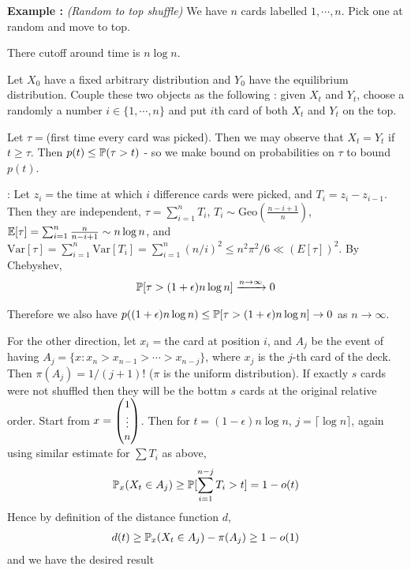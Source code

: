\documentclass[12pt,a4paper]{article}
\newenvironment{proof}
{\begin{changemargin}{1cm}{0.5cm} 
	}%
	{\end{changemargin}
}
\newenvironment{subproof}
{\begin{changemargin}{0.5cm}{0.5cm} 
	}%
	{\end{changemargin}
}
\newenvironment{p}
{\begin{proof} 
	}%
	{\end{proof}
}
\begin{document}
\textbf{Example :} \emph{(Random to top shuffle)} We have $n$ cards labelled $1, \cdots, n$. Pick one at random and move to top.
\s

 There cutoff around time is $n\log n$.
\begin{p}
\pf Let $X_0$ have a fixed arbitrary distribution and $Y_0$ have the equilibrium distribution. Couple these two objects as the following : given $X_t$ and $Y_t$, choose a randomly a number $i \in \{1,\cdots, n\}$ and put $i$th card of both $X_t$ and $Y_t$ on the top.

\quad Let $\tau =$(first time every card was picked). Then we may observe that $X_t = Y_t$ if $t \geq \tau$. Then $p(t) \leq \mathbb{P} (\tau >t )$ - so we make bound on probabilities on $\tau$ to bound $p(t)$.
\begin{subproof}
: Let $z_i=$the time at which $i$ difference cards were picked, and $T_i = z_i - z_{i-1}$. Then they are independent, $\tau = \sum_{i=1}^n T_i$, $T_i \sim \text{Geo}(\frac{n-i+1}{n})$, $\mathbb{E}[\tau] = \sum_{i=1}^n \frac{n}{n-i+1} \sim n\log n$, and $\text{Var}[\tau] = \sum_{i=1}^n \text{Var}[T_i] = \sum_{i=1}^n (n/i)^2 \leq n^2 \pi^2/6 \ll (E[\tau])^2$. By Chebyshev,
\begin{align*}
\mathbb{P}[\tau > (1+\epsilon) n\log n] \xrightarrow{n\rightarrow \infty} 0
\end{align*}
\end{subproof}
Therefore we also have $p((1+\epsilon)n\log n) \leq \mathbb{P}[\tau > (1+ \epsilon) n\log n] \rightarrow 0$ as $n\rightarrow \infty$.  
\s

For the other direction, let $x_i=$the card at position $i$, and $A_j$ be the event of having $A_j =\{ x : x_n> x_{n-1} > \cdots > x_{n-j}\}$, where $x_j$ is the $j$-th card of the deck. Then $\pi(A_j) = 1/(j+1)!$ ($\pi$ is the uniform distribution). If exactly $s$ cards were not shuffled then they will be the bottm $s$ cards at the original relative order. Start from $x = \begin{small} \begin{pmatrix}
1\\
\vdots\\
n
\end{pmatrix} \end{small}$. Then for $t = (1- \epsilon) n\log n$, $j = \lceil \log n \rceil$, again using similar estimate for $\sum T_i$ as above,
\begin{align*}
\mathbb{P}_x( X_t \in A_j) \geq \mathbb{P}[\sum_{i=1}^{n-j}T_i >t] = 1-o(t)
\end{align*}
Hence by definition of the distance function $d$,
\begin{align*}
d(t) \geq \mathbb{P}_x (X_t \in A_j) - \pi(A_j) \geq 1- o(1)
\end{align*}
and we have the desired result
\eop
\end{p}
\s
\end{document}
